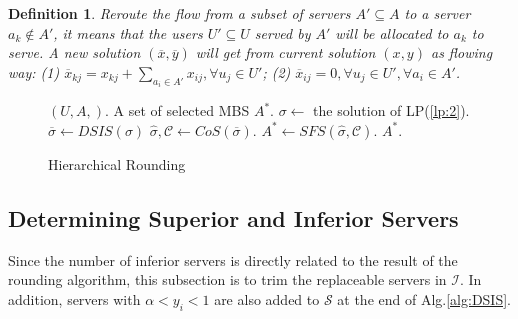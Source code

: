 \documentclass[journal]{IEEEtran}
\newtheorem{definition}{Definition}
\begin{document}
\begin{definition}
	Reroute the flow from a subset of servers $A' \subseteq A$ to a server $a_k \notin A'$, it means that the users $U' \subseteq U$ served by $A'$ will be allocated to $a_k$ to serve. A new solution $(\overline x, \overline y)$ will get from current solution $(x, y)$ as flowing way: (1) $\overline{x}_{kj} = {x}_{kj} + \sum\nolimits_{{a_i} \in A'} {{{x}_{ij}}}, \forall u_j \in U' $; (2) $\overline x_{ij} = 0, \forall u_j\in U', \forall a_i \in A'$.
	
\end{definition}
\begin{figure}[!t]
	\renewcommand{\algorithmicrequire}{\textbf{Input:}}
	\renewcommand{\algorithmicensure}{\textbf{Output:}}
	\begin{algorithm}[H]
		\caption{Hierarchical Rounding}
		\begin{algorithmic}[1]\label{alg:HR}
			\REQUIRE $(U, A, )$. 
			\ENSURE A set of selected MBS $A^*$.
			\STATE $\sigma \leftarrow $ the solution of LP(\ref{lp:2}).
			\STATE $\overline{\sigma} \leftarrow DSIS(\sigma)$
			\STATE $\widehat{\sigma}, \mathcal{C} \leftarrow CoS(\overline{\sigma})$.
			\STATE $A^* \leftarrow SFS(\widehat{\sigma}, \mathcal{C})$.
			\RETURN $A^*$.
		\end{algorithmic}
	\end{algorithm}
\end{figure}

\subsection{Determining Superior and Inferior Servers}
\label{subsec:DSIS}
Since the number of inferior servers is directly related to the result of the rounding algorithm, this subsection is to trim the replaceable servers in $\mathcal{I}$. In addition, servers with $\alpha < y_i < 1$ are also added to $\mathcal{S}$ at the end of Alg.\ref{alg:DSIS}.
\end{document}
